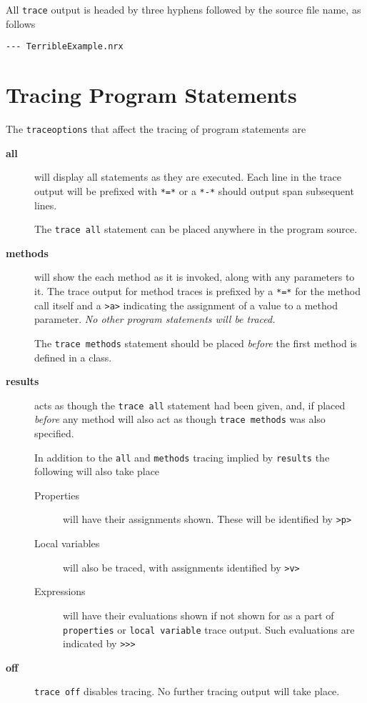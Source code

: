 {All \texttt{trace} output is headed by three hyphens followed by the source file name, as follows
\begin{verbatim}
--- TerribleExample.nrx
\end{verbatim}

\section{Tracing Program Statements}
The \texttt{traceoptions} that affect the tracing of program statements are
\begin{description}
\item[\textbf{all}] will display all statements as they are executed. Each line in the trace output will be prefixed with \texttt{*=*} or a \texttt{*-*} should output span subsequent lines.

The \texttt{trace all} statement can be placed anywhere in the program source. 

\item[\textbf{methods}] will show the each method as it is invoked, along with any parameters to it. The trace output for method traces is prefixed by a \texttt{*=*} for the method call itself and a \texttt{>a>} indicating the assignment of a value to a method parameter. \textit{No other program statements will be traced.}

The \texttt{trace methods} statement should be placed \textit{before} the first method is defined in a class.

\item[\textbf{results}] acts as though the \texttt{trace all} statement had been given, and, if placed \textit{before} any method will also act as though \texttt{trace methods} was also specified.

In addition to the \texttt{all} and \texttt{methods} tracing implied by \texttt{results} the following will also take place
\begin{description}

\item[Properties] will have their assignments shown. These will be identified by \texttt{>p>}

\item[Local variables] will also be traced, with assignments identified by \texttt{>v>}

\item[Expressions] will have their evaluations shown if not shown for as a part of \texttt{properties} or \texttt{local variable} trace output. Such evaluations are indicated by \texttt{>>>}
\end{description}
\item[\textbf{off}] \texttt{trace off} disables tracing. No further tracing output will take place.
\end{description} 

}
